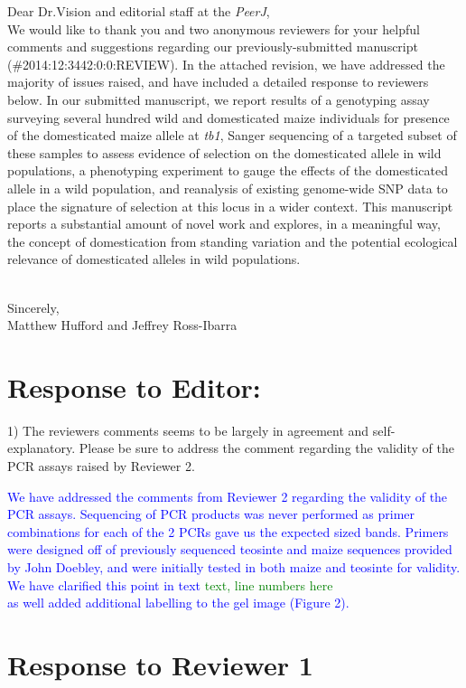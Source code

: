 \documentclass[11pt]{article}
\newcommand{\res}[1]{\noindent \textcolor{blue}{{#1}} \\}
\newcommand{\lev}[1]{\noindent \textcolor{green}{{#1}} \\}
\begin{document}
\noindent Dear Dr.Vision and editorial staff at the \emph{PeerJ}, \\

We would like to thank you and two anonymous reviewers for your helpful comments and suggestions regarding our previously-submitted manuscript (\#2014:12:3442:0:0:REVIEW).  In the attached revision, we have addressed the majority of issues raised, and have included a detailed response to reviewers below.  In our submitted manuscript, we report results of a genotyping assay surveying several hundred wild and domesticated maize individuals for presence of the domesticated maize allele at \emph{tb1}, Sanger sequencing of a targeted subset of these samples to assess evidence of selection on the domesticated allele in wild populations, a phenotyping experiment to gauge the effects of the domesticated allele in a wild population, and reanalysis of existing genome-wide SNP data to place the signature of selection at this locus in a wider context.  This manuscript reports a substantial amount of novel work and explores, in a meaningful way, the concept of domestication from standing variation and the potential ecological relevance of domesticated alleles in wild populations.\\\

\noindent Sincerely,\\

\noindent Matthew Hufford and Jeffrey Ross-Ibarra

\section*{Response to Editor:}

1) The reviewers comments seems to be largely in agreement and self-explanatory. Please be sure to address the comment regarding the validity of the PCR assays raised by Reviewer 2.

\res{We have addressed the comments from Reviewer 2 regarding the validity of the PCR assays. Sequencing of PCR products was never performed as primer combinations for each of the 2 PCRs gave us the expected sized bands. Primers were designed off of previously sequenced teosinte and maize sequences provided by John Doebley, and were initially tested in both maize and teosinte for validity.  We have clarified this point in text \lev{text, line numbers here} as well added additional labelling to the gel image (Figure 2).} 

\section*{Response to Reviewer 1}
\end{document}
